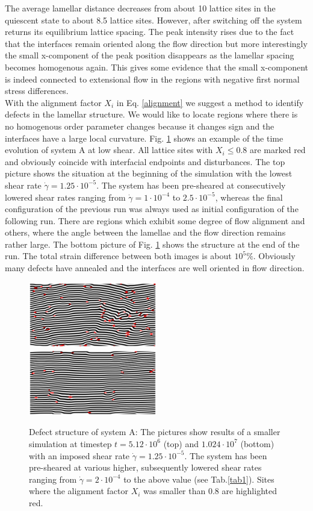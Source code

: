 \documentclass[8.5pt,twoside,twocolumn]{article}
\newcommand{\e}[1]{\cdot10^{#1}}
\newcommand{\gd}{\dot{\gamma}}
\begin{document}
The average lamellar distance decreases from about 10 lattice sites in the quiescent state to about 8.5 lattice sites.
However, after switching off the system returns its equilibrium lattice spacing.
The peak intensity rises due to the fact that the interfaces remain oriented along the flow direction but more interestingly the small x-component of the peak position disappears as the lamellar spacing becomes homogenous again.
This gives some evidence that the small x-component is indeed connected to extensional flow in the regions with negative first normal stress differences.\\
With the alignment factor $X_i$ in Eq. \ref{alignment} we suggest a method to identify defects in the lamellar structure.
We would like to locate regions where there is no homogenous order parameter changes because it changes sign and the interfaces have a large local curvature.
Fig. \ref{fig5} shows an example of the time evolution of system A at low shear.
All lattice sites with $X_i\le0.8$ are marked red and obviously coincide with interfacial endpoints and disturbances.
The top picture shows the situation at the beginning of the simulation with the lowest shear rate $\dot{\gamma}=1.25\e{-5}$.
The system has been pre-sheared at consecutively lowered shear rates ranging from $\gd=1\e{-4}$ to $2.5\e{-5}$, whereas the final configuration of the previous run was always used as initial configuration of the following run.
There are regions which exhibit some degree of flow alignment and others, where the angle between the lamellae and the flow direction remains rather large.
The bottom picture of Fig. \ref{fig5} shows the structure at the end of the run.
The total strain difference between both images is about $10^{5}\%$. 
Obviously many defects have annealed and the interfaces are well oriented in flow direction.
\begin{figure}[!]
\centering
\includegraphics[angle=0,width=0.5\textwidth]{phi_defects_run774_5120.jpg}
\includegraphics[angle=0,width=0.5\textwidth]{phi_defects_run774_10240.jpg}
\caption{Defect structure of system A: The pictures show results of a smaller simulation at timestep $t=5.12\e{6}$ (top) and $1.024\e{7}$ (bottom) with an imposed shear rate $\dot{\gamma}=1.25\cdot10^{-5}$. The system has been pre-sheared at various higher, subsequently lowered shear rates ranging from $\dot{\gamma}=2\e{-4}$ to the above value (see Tab.\ref{tab1}). Sites where the alignment factor $X_i$ was smaller than $0.8$ are highlighted red.}
\label{fig5}
\end{figure}
\end{document}
